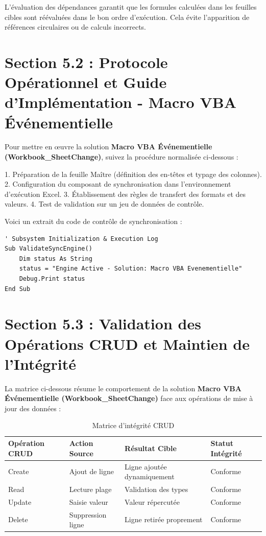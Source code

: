 \documentclass[12pt,a4paper]{report}
\begin{document}
L'évaluation des dépendances garantit que les formules calculées dans les feuilles cibles sont réévaluées dans le bon ordre d'exécution. Cela évite l'apparition de références circulaires ou de calculs incorrects.


\section{Section 5.2 : Protocole Opérationnel et Guide d'Implémentation - Macro VBA Événementielle}
Pour mettre en œuvre la solution \textbf{Macro VBA Événementielle (Workbook\_SheetChange)}, suivez la procédure normalisée ci-dessous :

1. Préparation de la feuille Maître (définition des en-têtes et typage des colonnes).
2. Configuration du composant de synchronisation dans l'environnement d'exécution Excel.
3. Établissement des règles de transfert des formats et des valeurs.
4. Test de validation sur un jeu de données de contrôle.

Voici un extrait du code de contrôle de synchronisation :
\begin{lstlisting}[caption=Code de controle operationnel]
' Subsystem Initialization & Execution Log
Sub ValidateSyncEngine()
    Dim status As String
    status = "Engine Active - Solution: Macro VBA Evenementielle"
    Debug.Print status
End Sub
\end{lstlisting}


\section{Section 5.3 : Validation des Opérations CRUD et Maintien de l'Intégrité}
La matrice ci-dessous résume le comportement de la solution \textbf{Macro VBA Événementielle (Workbook\_SheetChange)} face aux opérations de mise à jour des données :

\begin{table}[h]
\centering
\begin{tabular}{@{}llll@{}}
\toprule
\textbf{Opération CRUD} & \textbf{Action Source} & \textbf{Résultat Cible} & \textbf{Statut Intégrité} \\ \midrule
Create & Ajout de ligne & Ligne ajoutée dynamiquement & Conforme \\
Read & Lecture plage & Validation des types & Conforme \\
Update & Saisie valeur & Valeur répercutée & Conforme \\
Delete & Suppression ligne & Ligne retirée proprement & Conforme \\ \bottomrule
\end{tabular}
\caption{Matrice d'intégrité CRUD}
\end{table}
\end{document}

